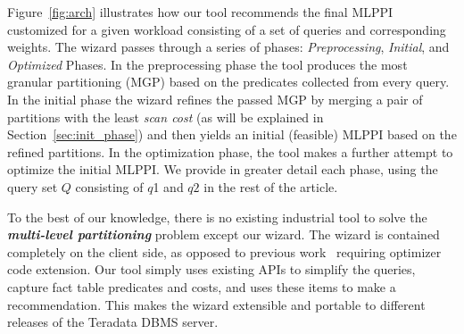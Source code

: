\documentclass[runningheads]{comsis2}
\begin{document}
Figure~\ref{fig:arch} illustrates how our tool recommends 
the final MLPPI customized for a given workload consisting of 
a set of queries and corresponding weights. 
The wizard passes through a series of phases: {\em Preprocessing}, 
{\em Initial}, and {\em Optimized} Phases. 
In the preprocessing phase the tool produces the most granular partitioning (MGP) based on the predicates collected from every query.
In the initial phase the wizard refines the passed MGP 
by merging a pair of partitions with the least {\em scan cost} (as will be explained in \hbox{Section~\ref{sec:init_phase}}) 
and then yields an initial (feasible) MLPPI based on the refined partitions.
In the \hbox{optimization} phase, the tool makes a further attempt to optimize the initial MLPPI. 
We provide in greater \hbox{detail} each phase, 
using the query set $Q$ consisting of $q$1 and $q2$ in the rest of the article.


To the best of our knowledge, there is no existing industrial tool 
to solve the {\it {\bf multi-level partitioning}} problem except our wizard. 
The wizard is contained completely on the client side, as opposed to 
previous work~\cite{agrawal04:integrating,Lightstone04:db2auto,nehme2011automated} 
requiring optimizer code extension. 
Our tool simply uses existing APIs to simplify the queries, capture fact table 
predicates and costs, and uses these items to make a recommendation. 
This makes the wizard extensible and portable to different releases 
of the Teradata DBMS server. 
\end{document}

